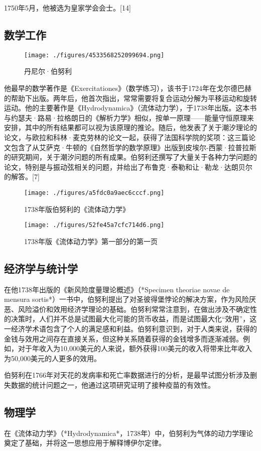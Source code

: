 1750年5月，他被选为皇家学会会士。[14]
\subsection{数学工作}
\begin{figure}[ht]
\centering
\texttt{[image: ./figures/4533568252099694.png]}
\caption{丹尼尔·伯努利} \label{fig_BNL_3}
\end{figure}
他最早的数学著作是《Exercitationes》（数学练习），该书于1724年在戈尔德巴赫的帮助下出版。两年后，他首次指出，常常需要将复合运动分解为平移运动和旋转运动。他的主要著作是《Hydrodynamica》（流体动力学），于1738年出版。这本书与约瑟夫·路易·拉格朗日的《解析力学》相似，按单一原理——能量守恒原理来安排，其中的所有结果都可以视为该原理的推论。随后，他发表了关于潮汐理论的论文，与欧拉和科林·麦克劳林的论文一起，获得了法国科学院的奖项：这三篇论文包含了从艾萨克·牛顿的《自然哲学的数学原理》出版到皮埃尔-西蒙·拉普拉斯的研究期间，关于潮汐问题的所有成果。伯努利还撰写了大量关于各种力学问题的论文，特别是与振动弦相关的问题，并给出了布鲁克·泰勒和让·勒龙·达朗贝尔的解答。[7]
\begin{figure}[ht]
\centering
\texttt{[image: ./figures/a5fdc0a9aec6cccf.png]}
\caption{1738年版伯努利的《流体动力学》} \label{fig_BNL_4}
\end{figure}
\begin{figure}[ht]
\centering
\texttt{[image: ./figures/52fe45a7cfc714d6.png]}
\caption{1738年版《流体动力学》第一部分的第一页} \label{fig_BNL_5}
\end{figure}
\subsection{经济学与统计学}  
在他1738年出版的《新风险度量理论概述》（*Specimen theoriae novae de mensura sortis*）一书中，伯努利提出了对圣彼得堡悖论的解决方案，作为风险厌恶、风险溢价和效用经济学理论的基础。伯努利常常注意到，在做出涉及不确定性的决策时，人们并不总是试图最大化可能的货币收益，而是试图最大化“效用”，这一经济学术语包含了个人的满足感和利益。伯努利意识到，对于人类来说，获得的金钱与效用之间存在直接关系，但这种关系随着获得的金钱增多而逐渐减弱。例如，对于年收入为10,000美元的人来说，额外获得100美元的收入将带来比年收入为50,000美元的人更多的效用。

伯努利在1766年对天花的发病率和死亡率数据进行的分析，是最早试图分析涉及删失数据的统计问题之一，他通过这项研究证明了接种疫苗的有效性。
\subsection{物理学}  
在《流体动力学》（*Hydrodynamica*，1738年）中，伯努利为气体的动力学理论奠定了基础，并将这一思想应用于解释博伊尔定律。

